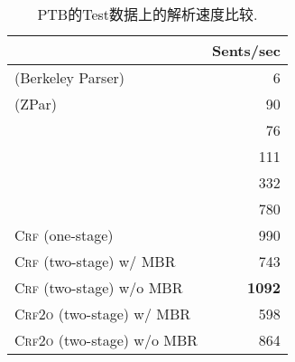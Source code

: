 \begin{table}[tb]
  \setlength{\tabcolsep}{15pt}
  \centering
  \caption{PTB的Test数据上的解析速度比较.}
  \begin{tabular}{lr}
    \toprule
                                                          & Sents/sec     \\
    \midrule
    \citet{petrov-klein-2007-improved}  (Berkeley Parser) & 6             \\
    \citet{zhu-etal-2013-fast} (ZPar)                     & 90            \\
    \citet{stern-etal-2017-minimal}                       & 76            \\
    \citet{shen-etal-2018-straight}                       & 111           \\
    \citet{kitaev-klein-2018-constituency}                & 332           \\
    \citet{gomez-rodriguez-vilares-2018-constituent}      & 780           \\[3pt]
    \textsc{Crf} (one-stage)                              & 990           \\
    \textsc{Crf} (two-stage) w/ MBR                       & 743           \\
    \textsc{Crf} (two-stage) w/o MBR                      & \textbf{1092} \\
    \textsc{Crf2o} (two-stage) w/ MBR                     & 598           \\
    \textsc{Crf2o} (two-stage) w/o MBR                    & 864           \\

    \bottomrule
  \end{tabular}
  \label{table:speed}
\end{table}